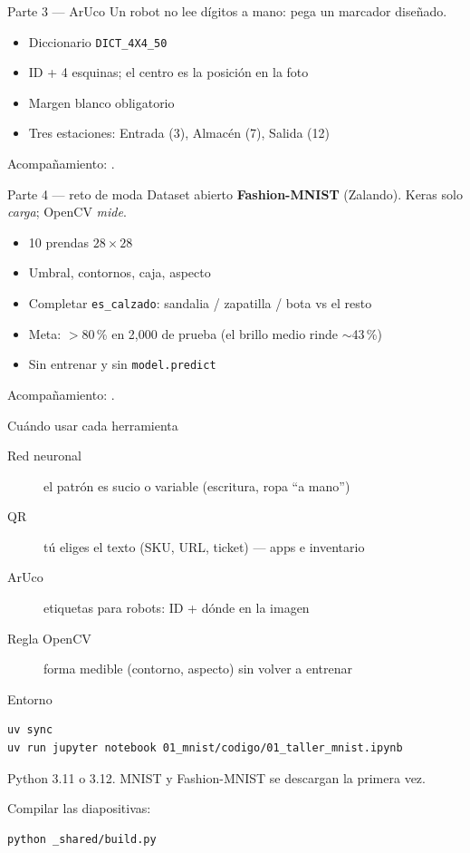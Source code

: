 \documentclass[aspectratio=169]{beamer}
\begin{document}
\begin{frame}{Parte 3 --- ArUco}
  Un robot no lee dígitos a mano: pega un marcador diseñado.

  \begin{itemize}
    \item Diccionario \texttt{DICT\_4X4\_50}
    \item ID + 4 esquinas; el centro es la posición en la foto
    \item Margen blanco obligatorio
    \item Tres estaciones: Entrada (3), Almacén (7), Salida (12)
  \end{itemize}

  Acompañamiento: .
\end{frame}

\begin{frame}{Parte 4 --- reto de moda}
  Dataset abierto \textbf{Fashion-MNIST} (Zalando). Keras solo \emph{carga}; OpenCV \emph{mide}.

  \begin{itemize}
    \item 10 prendas $28\times28$
    \item Umbral, contornos, caja, aspecto
    \item Completar \texttt{es\_calzado}: sandalia / zapatilla / bota vs el resto
    \item Meta: $>$80\,\% en 2{,}000 de prueba (el brillo medio rinde $\sim$43\,\%)
    \item Sin entrenar y sin \texttt{model.predict}
  \end{itemize}

  Acompañamiento: .
\end{frame}

\begin{frame}{Cuándo usar cada herramienta}
  \begin{description}
    \item[Red neuronal] el patrón es sucio o variable (escritura, ropa ``a mano'')
    \item[QR] tú eliges el texto (SKU, URL, ticket) --- apps e inventario
    \item[ArUco] etiquetas para robots: ID + dónde en la imagen
    \item[Regla OpenCV] forma medible (contorno, aspecto) sin volver a entrenar
  \end{description}
\end{frame}

\begin{frame}[fragile]{Entorno}
  \begin{verbatim}
uv sync
uv run jupyter notebook 01_mnist/codigo/01_taller_mnist.ipynb
  \end{verbatim}

  Python 3.11 o 3.12. MNIST y Fashion-MNIST se descargan la primera vez.

  Compilar las diapositivas:
  \begin{verbatim}
python _shared/build.py
  \end{verbatim}
\end{frame}
\end{document}
